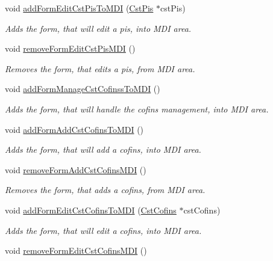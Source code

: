 \begin{DoxyCompactItemize}
void \hyperlink{class_main_window_a81063744242f92e44ce4a8233105d71f}{add\-Form\-Edit\-Cst\-Pis\-To\-M\-D\-I} (\hyperlink{class_cst_pis}{\-Cst\-Pis} $\ast$cst\-Pis)
\begin{DoxyCompactList}\small\item\em \-Adds the form, that will edit a pis, into \-M\-D\-I area. \end{DoxyCompactList}\item 
void \hyperlink{class_main_window_ab84cc6797774bcdb98dc5a8bfa686271}{remove\-Form\-Edit\-Cst\-Pis\-M\-D\-I} ()
\begin{DoxyCompactList}\small\item\em \-Removes the form, that edits a pis, from \-M\-D\-I area. \end{DoxyCompactList}\item 
void \hyperlink{class_main_window_a6b1c71775bf1a9e4f9b2b2e5239e127b}{add\-Form\-Manage\-Cst\-Cofinss\-To\-M\-D\-I} ()
\begin{DoxyCompactList}\small\item\em \-Adds the form, that will handle the cofins management, into \-M\-D\-I area. \end{DoxyCompactList}\item 
void \hyperlink{class_main_window_aa674ffba1271d527582f5c5297b696f6}{add\-Form\-Add\-Cst\-Cofins\-To\-M\-D\-I} ()
\begin{DoxyCompactList}\small\item\em \-Adds the form, that will add a cofins, into \-M\-D\-I area. \end{DoxyCompactList}\item 
void \hyperlink{class_main_window_a613284e172eab5779bf6793052de6dce}{remove\-Form\-Add\-Cst\-Cofins\-M\-D\-I} ()
\begin{DoxyCompactList}\small\item\em \-Removes the form, that adds a cofins, from \-M\-D\-I area. \end{DoxyCompactList}\item 
void \hyperlink{class_main_window_af33ee95d3d0c7359310cc54ae84c709d}{add\-Form\-Edit\-Cst\-Cofins\-To\-M\-D\-I} (\hyperlink{class_cst_cofins}{\-Cst\-Cofins} $\ast$cst\-Cofins)
\begin{DoxyCompactList}\small\item\em \-Adds the form, that will edit a cofins, into \-M\-D\-I area. \end{DoxyCompactList}\item 
void \hyperlink{class_main_window_afc2c090a4461b9276a38cacab572eb64}{remove\-Form\-Edit\-Cst\-Cofins\-M\-D\-I} ()

\end{DoxyCompactItemize}
